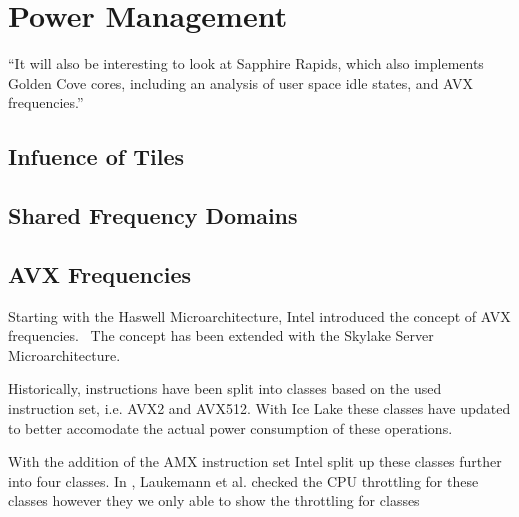 \chapter{Power Management}
``It will also be interesting to look at Sapphire Rapids, which also implements Golden Cove cores, including an analysis of user space idle states, and AVX frequencies.''

\section{Infuence of Tiles}

\section{Shared Frequency Domains}

\section{AVX Frequencies}

Starting with the Haswell Microarchitecture, Intel introduced the concept of AVX frequencies.~\cite{Hackenberg_2015_Haswell}
The concept has been extended with the Skylake Server Microarchitecture.

Historically, instructions have been split into classes based on the used instruction set, i.e. AVX2 and AVX512.
With Ice Lake these classes have updated to better accomodate the actual power consumption of these operations.

With the addition of the AMX instruction set Intel split up these classes further into four classes.
In , Laukemann et al. checked the CPU throttling for these classes however they we only able to show the throttling for classes 

